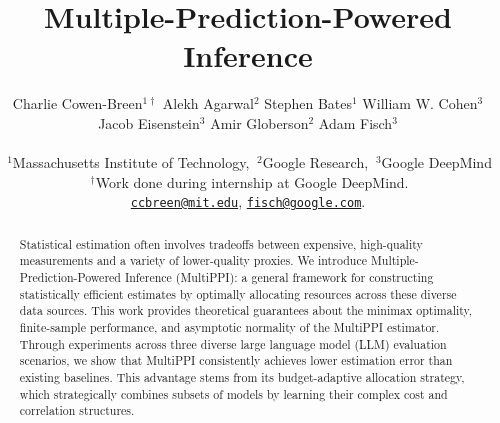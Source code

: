 \documentclass{article} %
\title{Multiple-Prediction-Powered Inference}
\author{Charlie Cowen-Breen$^{1\dagger}$ \hfill \quad Alekh Agarwal$^2$ \quad \hfill Stephen Bates$^1$ \AND  William W. Cohen$^3$ \qquad Jacob Eisenstein$^3$ \qquad Amir Globerson$^2$ \qquad  Adam Fisch$^3$ \\\\ $~^{1}$Massachusetts Institute of Technology, $~^2$Google Research, $~^3$Google DeepMind\\ $~^\dagger$Work done during internship at Google DeepMind.\\
\href{mailto:ccbreen@mit.edu}{\texttt{ccbreen@mit.edu}}, \href{mailto:fisch@google.com}{\texttt{fisch@google.com}}. 
}
\newcommand{\jacob}[1]{ {\color{blue}[JE: #1]}}
\begin{document}
\maketitle


\begin{abstract}



Statistical estimation often involves tradeoffs between expensive, high-quality measurements and a variety of lower-quality proxies. We introduce Multiple-Prediction-Powered Inference (MultiPPI): a general framework for constructing statistically efficient estimates by optimally allocating resources across these diverse data sources. This work provides theoretical guarantees about the minimax optimality, finite-sample performance, and asymptotic normality of the MultiPPI estimator. Through experiments across three diverse large language model (LLM) evaluation scenarios, we show that MultiPPI consistently achieves lower estimation error than existing baselines. This advantage stems from its budget-adaptive allocation strategy, which strategically combines subsets of models by learning their complex cost and correlation structures.



\end{abstract}
\end{document}
